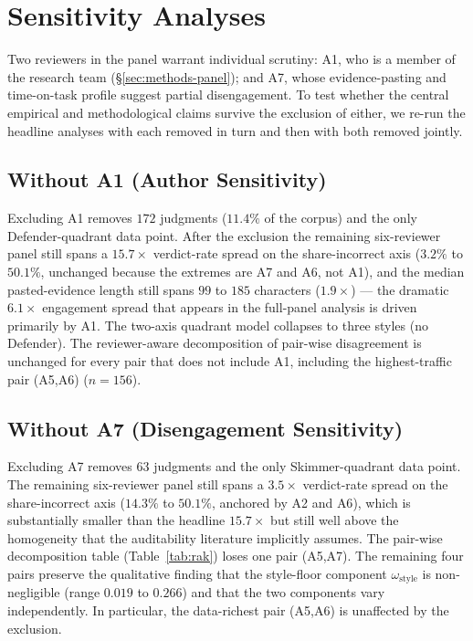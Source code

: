 \documentclass[11pt,a4paper]{article}
\newcommand{\Acc}[1]{\textsf{A#1}}
\begin{document}
\section{Sensitivity Analyses}
\label{sec:sensitivity}

Two reviewers in the panel warrant individual scrutiny: \Acc{1}, who
is a member of the research team (\S\ref{sec:methods-panel}); and
\Acc{7}, whose evidence-pasting and time-on-task profile suggest
partial disengagement. To test whether the central empirical and
methodological claims survive the exclusion of either, we re-run the
headline analyses with each removed in turn and then with both
removed jointly.

\subsection{Without \Acc{1} (Author Sensitivity)}
\label{sec:sens-no-a1}

Excluding \Acc{1} removes $172$ judgments ($11.4\%$ of the corpus)
and the only Defender-quadrant data point. After the exclusion the
remaining six-reviewer panel still spans a $15.7{\times}$ verdict-rate
spread on the share-incorrect axis ($3.2\%$ to $50.1\%$, unchanged
because the extremes are \Acc{7} and \Acc{6}, not \Acc{1}), and the
median pasted-evidence length still spans $99$ to $185$ characters
($1.9{\times}$) --- the dramatic $6.1{\times}$ engagement spread that
appears in the full-panel analysis is driven primarily by \Acc{1}.
The two-axis quadrant model collapses to three styles
(no Defender). The reviewer-aware decomposition of pair-wise
disagreement is unchanged for every pair that does not include
\Acc{1}, including the highest-traffic pair (\Acc{5},\Acc{6})
($n=156$).

\subsection{Without \Acc{7} (Disengagement Sensitivity)}
\label{sec:sens-no-a7}

Excluding \Acc{7} removes $63$ judgments and the only Skimmer-quadrant
data point. The remaining six-reviewer panel still spans a
$3.5{\times}$ verdict-rate spread on the share-incorrect axis
($14.3\%$ to $50.1\%$, anchored by \Acc{2} and \Acc{6}), which is
substantially smaller than the headline $15.7{\times}$ but still well
above the homogeneity that the auditability literature implicitly
assumes. The pair-wise decomposition table (Table~\ref{tab:rak})
loses one pair (\Acc{5},\Acc{7}). The remaining four pairs preserve
the qualitative finding that the style-floor component
$\omega_{\text{style}}$ is non-negligible (range $0.019$ to $0.266$)
and that the two components vary independently. In particular, the
data-richest pair (\Acc{5},\Acc{6}) is unaffected by the exclusion.
\end{document}

